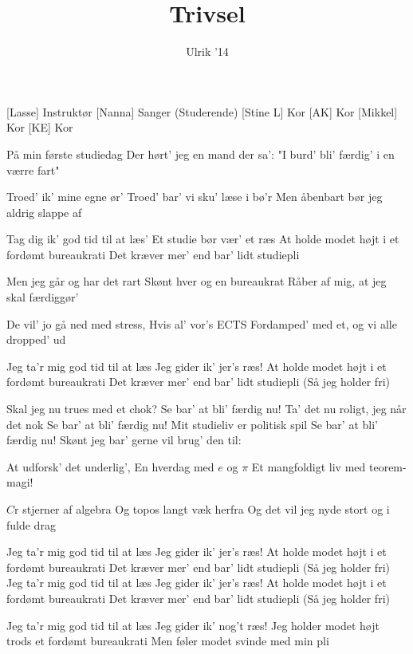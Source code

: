 \documentclass[a4paper,11pt]{article}
\title{Trivsel}
\author{Ulrik '14}
\begin{document}
\maketitle

\begin{roles}
[Lasse] Instruktør
[Nanna] Sanger (Studerende)
[Stine L] Kor
[AK] Kor
[Mikkel] Kor
[KE] Kor
\end{roles}

\begin{song}
 På min første studiedag
Der hørt' jeg en mand der sa':
"I burd' bli' færdig' i en værre fart"

 Troed' ik' mine egne ør'
Troed' bar' vi sku' læse i bø'r
Men åbenbart bør jeg aldrig slappe af

 Tag dig ik' god tid til at læs'
Et studie bør vær' et ræs
At holde modet højt i et fordømt bureaukrati
Det kræver mer' end bar' lidt studiepli

 Men jeg går og har det rart
Skønt hver og en bureaukrat
Råber af mig, at jeg skal færdiggør'

 De vil' jo gå ned med stress,
Hvis al' vor's ECTS
Fordamped' med et, og vi alle dropped' ud

 Jeg ta'r mig god tid til at læs
Jeg gider ik' jer's ræs!
At holde modet højt i et fordømt bureaukrati
Det kræver mer' end bar' lidt studiepli
(Så jeg holder fri)

 Skal jeg nu trues med et chok?
 Se bar' at bli' færdig nu!
 Ta' det nu roligt, jeg når det nok
 Se bar' at bli' færdig nu!
 Mit studieliv er politisk spil
 Se bar' at bli' færdig nu!
 Skønt jeg bar' gerne vil brug' den til:

 At udforsk' det underlig',
En hverdag med $e$ og $\pi$
Et mangfoldigt liv med teorem-magi!

 $C$r stjerner af algebra
Og topos langt væk herfra
Og det vil jeg nyde stort og i fulde drag

 Jeg ta'r mig god tid til at læs
Jeg gider ik' jer's ræs!
At holde modet højt i et fordømt bureaukrati
Det kræver mer' end bar' lidt studiepli
(Så jeg holder fri)
Jeg ta'r mig god tid til at læs
Jeg gider ik' jer's ræs!
At holde modet højt i et fordømt bureaukrati
Det kræver mer' end bar' lidt studiepli
(Så jeg holder fri)

 Jeg ta'r mig god tid til at læs
Jeg gider ik' nog't ræs!
Jeg holder modet højt trods et fordømt bureaukrati
Men føler modet svinde med min pli
\end{song}
\end{document}
